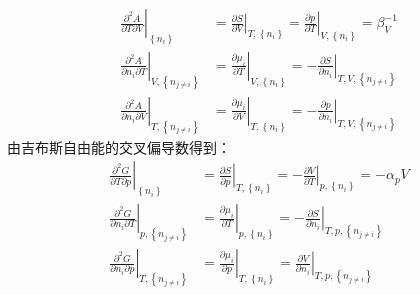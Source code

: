 \documentclass[main.tex]{subfiles}
\begin{document}
\begin{align}
    \left.\frac{\partial^2 A}{\partial T\partial V}\right|_{\left\{n_i\right\}}             & =\left.\frac{\partial S}{\partial V}\right|_{T,\left\{n_i\right\}}=\left.\frac{\partial p}{\partial T}\right|_{V,\left\{n_i\right\}}=\beta_V^{-1}\label{eq:I.1_Maxwell_ATV}     \\
    \left.\frac{\partial ^2A}{\partial n_i\partial T}\right|_{V,\left\{n_{j\neq i}\right\}} & =\left.\frac{\partial \mu_i}{\partial T}\right|_{V,\left\{n_i\right\}}=-\left.\frac{\partial S}{\partial n_i}\right|_{T,V,\left\{n_{j\neq i}\right\}}\label{eq:I.1_Maxwell_AnT} \\
    \left.\frac{\partial ^2A}{\partial n_i\partial V}\right|_{T,\left\{n_{j\neq i}\right\}} & =\left.\frac{\partial \mu_i}{\partial V}\right|_{T,\left\{n_i\right\}}=-\left.\frac{\partial p}{\partial n_i}\right|_{T,V,\left\{n_{j\neq i}\right\}}\label{eq:I.1_Maxwell_AnV}
\end{align}
由吉布斯自由能的交叉偏导数得到：
\begin{align}
    \left.\frac{\partial^2 G}{\partial T\partial p}\right|_{\left\{n_i\right\}}             & =\left.\frac{\partial S}{\partial p}\right|_{T,\left\{n_i\right\}}=-\left.\frac{\partial V}{\partial T}\right|_{p,\left\{n_i\right\}}=-\alpha_p V\label{eq:I.1_Maxwell_GTp}     \\
    \left.\frac{\partial ^2G}{\partial n_i\partial T}\right|_{p,\left\{n_{j\neq i}\right\}} & =\left.\frac{\partial \mu_i}{\partial T}\right|_{p,\left\{n_i\right\}}=-\left.\frac{\partial S}{\partial n_i}\right|_{T,p,\left\{n_{j\neq i}\right\}}\label{eq:I.1_Maxwell_GnT} \\
    \left.\frac{\partial ^2G}{\partial n_i\partial p}\right|_{T,\left\{n_{j\neq i}\right\}} & =\left.\frac{\partial \mu_i}{\partial p}\right|_{T,\left\{n_i\right\}}=\left.\frac{\partial V}{\partial n_i}\right|_{T,p,\left\{n_{j\neq i}\right\}}\label{eq:I.1_Maxwell_GnV}
\end{align}
\end{document}
